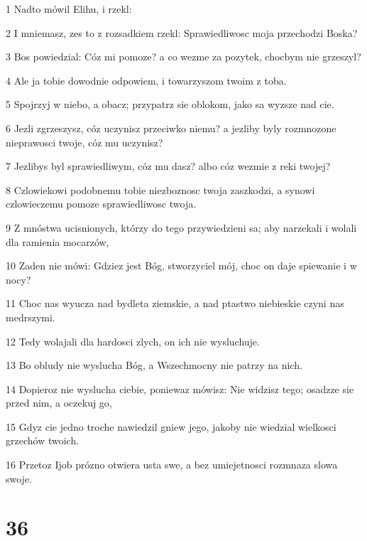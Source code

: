 \par 1 Nadto mówil Elihu, i rzekl:
\par 2 I mniemasz, zes to z rozsadkiem rzekl: Sprawiedliwosc moja przechodzi Boska?
\par 3 Bos powiedzial: Cóz mi pomoze? a co wezme za pozytek, chocbym nie grzeszyl?
\par 4 Ale ja tobie dowodnie odpowiem, i towarzyszom twoim z toba.
\par 5 Spojrzyj w niebo, a obacz; przypatrz sie oblokom, jako sa wyzsze nad cie.
\par 6 Jezli zgrzeszysz, cóz uczynisz przeciwko niemu? a jezliby byly rozmnozone nieprawosci twoje, cóz mu uczynisz?
\par 7 Jezlibys byl sprawiedliwym, cóz mu dasz? albo cóz wezmie z reki twojej?
\par 8 Czlowiekowi podobnemu tobie niezboznosc twoja zaszkodzi, a synowi czlowieczemu pomoze sprawiedliwosc twoja.
\par 9 Z mnóstwa ucisnionych, którzy do tego przywiedzieni sa; aby narzekali i wolali dla ramienia mocarzów,
\par 10 Zaden nie mówi: Gdziez jest Bóg, stworzyciel mój, choc on daje spiewanie i w nocy?
\par 11 Choc nas wyucza nad bydleta ziemskie, a nad ptastwo niebieskie czyni nas medrszymi.
\par 12 Tedy wolajali dla hardosci zlych, on ich nie wysluchuje.
\par 13 Bo obludy nie wyslucha Bóg, a Wszechmocny nie patrzy na nich.
\par 14 Dopieroz nie wyslucha ciebie, poniewaz mówisz: Nie widzisz tego; osadzze sie przed nim, a oczekuj go,
\par 15 Gdyz cie jedno troche nawiedzil gniew jego, jakoby nie wiedzial wielkosci grzechów twoich.
\par 16 Przetoz Ijob prózno otwiera usta swe, a bez umiejetnosci rozmnaza slowa swoje.

\chapter{36}

